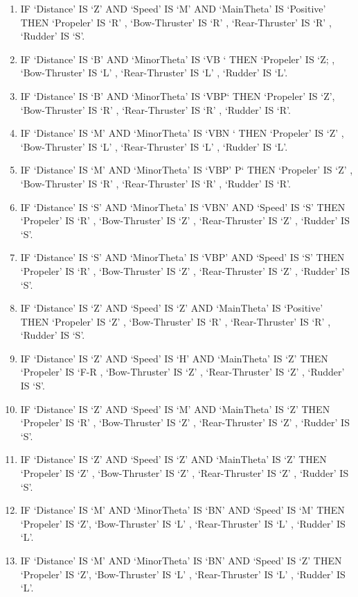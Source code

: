 \begin{enumerate}
\item IF ‘Distance’ IS ‘Z’   AND ‘Speed’ IS ‘M’  AND ‘MainTheta’ IS ‘Positive’ THEN ‘Propeler’ IS ‘R’ ,  ‘Bow-Thruster’ IS ‘R’  ,  ‘Rear-Thruster’ IS  ‘R’  ,  ‘Rudder’ IS ‘S’. 
\item	IF ‘Distance’ IS ‘B’  AND ‘MinorTheta’ IS ‘VB ‘ THEN ‘Propeler’ IS ‘Z; ,  ‘Bow-Thruster’ IS ‘L’  ,  ‘Rear-Thruster’ IS  ‘L’  ,  ‘Rudder’ IS ‘L’. 
\item	IF ‘Distance’ IS ‘B’  AND ‘MinorTheta’ IS ‘VBP‘ THEN ‘Propeler’ IS ‘Z’,  ‘Bow-Thruster’ IS ‘R’  ,  ‘Rear-Thruster’ IS  ‘R’  ,  ‘Rudder’ IS ‘R’. 
\item	IF ‘Distance’ IS ‘M’  AND ‘MinorTheta’ IS ‘VBN	 ‘ THEN ‘Propeler’ IS  ‘Z’ ,  ‘Bow-Thruster’ IS ‘L’  ,  ‘Rear-Thruster’ IS  ‘L’  ,  ‘Rudder’ IS ‘L’. 
\item	IF ‘Distance’ IS ‘M’  AND ‘MinorTheta’ IS ‘VBP’	P‘ THEN ‘Propeler’ IS  ‘Z’ ,  ‘Bow-Thruster’ IS ‘R’  ,  ‘Rear-Thruster’ IS  ‘R’  ,  ‘Rudder’ IS ‘R’. 
\item	IF ‘Distance’ IS ‘S’  AND ‘MinorTheta’ IS ‘VBN’ AND ‘Speed’  IS  ‘S’  THEN ‘Propeler’ IS  ‘R’ ,  ‘Bow-Thruster’ IS ‘Z’  ,  ‘Rear-Thruster’ IS  ‘Z’  ,  ‘Rudder’ IS ‘S’. 
\item	IF ‘Distance’ IS ‘S’  AND ‘MinorTheta’ IS ‘VBP’  AND ‘Speed’  IS  ‘S’  THEN ‘Propeler’ IS ‘R’ ,  ‘Bow-Thruster’ IS ‘Z’  ,  ‘Rear-Thruster’ IS  ‘Z’  ,  ‘Rudder’ IS ‘S’. 
\item	IF ‘Distance’ IS ‘Z’   AND ‘Speed’ IS ‘Z’  AND ‘MainTheta’ IS ‘Positive’ THEN ‘Propeler’ IS ‘Z’ ,  ‘Bow-Thruster’ IS ‘R’  ,  ‘Rear-Thruster’ IS  ‘R’  ,  ‘Rudder’ IS ‘S’. 
\item	IF ‘Distance’ IS ‘Z’   AND ‘Speed’ IS ‘H’  AND ‘MainTheta’ IS ‘Z’ THEN ‘Propeler’ IS ‘F-R ,  ‘Bow-Thruster’ IS ‘Z’  ,  ‘Rear-Thruster’ IS  ‘Z’  ,  ‘Rudder’ IS ‘S’. 
\item	IF ‘Distance’ IS ‘Z’   AND ‘Speed’ IS ‘M’  AND ‘MainTheta’ IS ‘Z’ THEN  ‘Propeler’ IS ‘R’ ,  ‘Bow-Thruster’ IS ‘Z’  ,  ‘Rear-Thruster’ IS  ‘Z’  ,  ‘Rudder’ IS ‘S’. 
\item	IF ‘Distance’ IS ‘Z’   AND ‘Speed’ IS ‘Z’  AND ‘MainTheta’ IS ‘Z’ THEN ‘Propeler’ IS ‘Z’ ,  ‘Bow-Thruster’ IS ‘Z’  ,  ‘Rear-Thruster’ IS  ‘Z’  ,  ‘Rudder’ IS ‘S’. 
\item	IF ‘Distance’ IS  ‘M’  AND  ‘MinorTheta’ IS ‘BN’  AND ‘Speed’ IS ‘M’  THEN ‘Propeler’ IS ‘Z’,  ‘Bow-Thruster’ IS ‘L’ ,  ‘Rear-Thruster’ IS  ‘L’ ,  ‘Rudder’ IS ‘L’.
\item	IF ‘Distance’ IS  ‘M’  AND  ‘MinorTheta’ IS ‘BN’  AND ‘Speed’  IS ‘Z’  THEN ‘Propeler’ IS ‘Z’,  ‘Bow-Thruster’ IS ‘L’ ,  ‘Rear-Thruster’ IS  ‘L’ ,  ‘Rudder’ IS ‘L’.

\end{enumerate}
